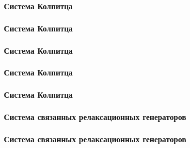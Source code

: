 \documentclass[10pt,utf8]{beamer}
\begin{document}

\begin{frame}
  \frametitle{Система Колпитца}


\end{frame}




\begin{frame}
  \frametitle{Система Колпитца}


\end{frame}




\begin{frame}
  \frametitle{Система Колпитца}


\end{frame}




\begin{frame}
  \frametitle{Система Колпитца}


\end{frame}




\begin{frame}
  \frametitle{Система Колпитца}


\end{frame}




\begin{frame}
  \frametitle{Система связанных релаксационных генераторов}


\end{frame}




\begin{frame}
  \frametitle{Система связанных релаксационных генераторов}


\end{frame}
\end{document}
